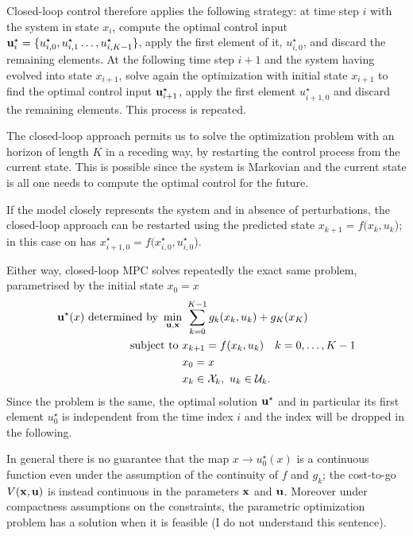 Closed-loop control therefore applies the following strategy: at time step $i$ with the system in state $x_i$, compute the optimal control input $\boldsymbol{\mathrm{u}}_i^\star=\{u_{i,0}^\star,u_{i,1}^\star\ldots,u_{i,K-1}^\star\}$, apply the first element of it, $u_{i,0}^\star$, and discard the remaining elements. At the following time step $i+1$ and the system having evolved into state $x_{i+1}$, solve again the optimization with initial state $x_{i+1}$ to find the optimal control input $\boldsymbol{\mathrm{u}}_{i+1}^\star$, apply the first element $u_{i+1,0}^\star$ and discard the remaining elements. This process is repeated.

The closed-loop approach permits us to solve the optimization problem with an horizon of length $K$ in a receding way, by restarting the control process from the current state. This is possible since the system is Markovian and the current state is all one needs to compute the optimal control for the future.

If the model closely represents the system and in absence of perturbations, the closed-loop approach can be restarted using the predicted state $x_{k+1} = f(x_k,u_k$); in this case on has $x_{i+1,0}^\star = f(x_{i,0}^\star,u_{i,0}^\star$).

Either way, closed-loop MPC solves repeatedly the exact same problem, parametrised by the initial state $x_0=x$
\begin{align*}
  \bsu^\star(x) \text{ determined by } \min_{\bsu, \bsx} &\ \sum_{k=0}^{K-1}g_k(x_k, u_k) + g_K(x_K)\\
  \text{subject to } & x_{k+1} = f(x_k,u_k)\quad k=0,\ldots,K-1 \\
                                                         & x_0 = x \\
                                                         & x_k \in \mathcal{X}_k,\ u_k \in \mathcal{U}_k.
\end{align*}
Since the problem is the same, the optimal solution $\boldsymbol{\mathrm{u}}^\star$ and in particular its first element $u_0^\star$ is independent from the time index $i$ and the index will be dropped in the following.

In general there is no guarantee that the map $x \rightarrow u_0^\star(x)$ is a continuous function even under the assumption of the continuity of $f$ and $g_k$; the cost-to-go $V(\boldsymbol{\mathrm{x}},\boldsymbol{\mathrm{u}})$ is instead continuous in the parameters $\boldsymbol{\mathrm{x}}$ and $\boldsymbol{\mathrm{u}}$. Moreover under compactness assumptions on the constraints, the parametric optimization problem has a solution when it is feasible (I do not understand this sentence).


